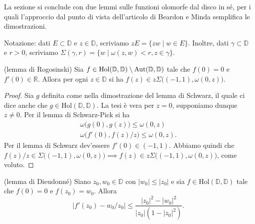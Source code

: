 La sezione si conclude con due lemmi sulle funzioni olomorfe dal disco in sé, per i quali l'approccio dal punto di vista dell'articolo di Beardon e Minda semplifica le dimostrazioni.


Notazione: dati $E \subset \mathbb{D}$ e $z \in \mathbb{D}$, scriviamo $zE=\{zw \mid w \in E\}$. Inoltre, dati $\gamma \subset \mathbb{D}$ e $r>0$, scriviamo $\Sigma(\gamma,r)=\{w \mid \omega(z,w)<r, z \in \gamma\}$.

\begin{lm}
  (lemma di Rogosinski) Sia $f \in \normalfont{\text{Hol}}(\mathbb{D},\mathbb{D})\setminus\normalfont{\text{Aut}}(\mathbb{D},\mathbb{D})$ tale che $f(0)=0$ e $f'(0) \in \mathbb{R}$. Allora per ogni $z \in \mathbb{D}$ si ha $f(z) \in z\Sigma\bigl((-1,1),\omega(0,z)\bigr)$.
\end{lm}

\begin{proof}
  Sia $g$ definita come nella dimostrazione del lemma di Schwarz, il quale ci dice anche che $g \in \text{Hol}(\mathbb{D},\mathbb{D})$. La tesi è vera per $z=0$, supponiamo dunque $z\not=0$. Per il lemma di Schwarz-Pick si ha
  \begin{gather*}
    \omega\bigl(g(0),g(z)\bigr) \le \omega(0,z) \\
    \omega\bigl(f'(0),f(z)/z\bigr) \le \omega(0,z).
  \end{gather*}
  Per il lemma di Schwarz dev'essere $f'(0) \in (-1,1)$. Abbiamo quindi che $f(z)/z \in \Sigma\bigl((-1,1),\omega(0,z)\bigr) \implies f(z) \in z\Sigma\bigl((-1,1),\omega(0,z)\bigr)$, come voluto.
\end{proof}

\begin{lm}
  (lemma di Dieudonné) Siano $z_0,w_0 \in \mathbb{D}$ con $|w_0| \le |z_0|$ e sia $f \in \text{Hol}(\mathbb{D},\mathbb{D})$ tale che $f(0)=0$ e $f(z_0)=w_0$. Allora
  \begin{equation}
    |f'(z_0)-w_0/z_0| \le \frac{|z_0|^2-|w_0|^2}{|z_0|(1-|z_0|^2)}.
  \end{equation}
\end{lm}


